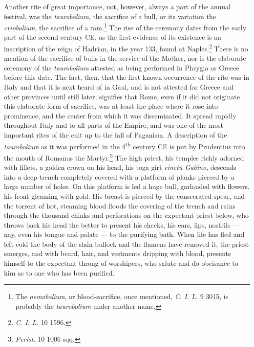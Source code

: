 \documentclass[a4paper, 11pt, oneside, polutonikogreek, english]{article}
\begin{document}
Another rite of great importance, not, however, always a part of the annual festival, was the \emph{taurobolium}, the sacrifice of a bull, or its variation the \emph{criobolium}, the sacrifice of a ram.\footnote{The \emph{aemobolium}, or blood-sacrifice, once mentioned, \emph{C. I. L.} 9 3015, is probably the \emph{taurobolium} under another name.} The rise of the ceremony dates from the early part of the second century \textsc{CE}, as the first evidence of its existence is an inscription of the reign of Hadrian, in the year 133, found at Naples.\footnote{\emph{C. I. L.} 10 1596.} There is no mention of the sacrifice of bulls in the service of the Mother, nor is the elaborate ceremony of the \emph{taurobolium} attested as being performed in Phrygia or Greece before this date. The fact, then, that the first known occurrence of the rite was in Italy and that it is next heard of in Gaul, and is not attested for Greece and other provinces until still later, signifies that Rome, even if it did not originate this elaborate form of sacrifice, was at least the place where it rose into prominence, and the center from which it was disseminated. It spread rapidly throughout Italy and to all parts of the Empire, and was one of the most important rites of the cult up to the fall of Paganism. A description of the \emph{taurobolium} as it was performed in the 4\textsuperscript{th} century \textsc{CE} is put by Prudentius into the mouth of Romanus the Martyr.\footnote{\emph{Perist.} 10 1006 sqq.} The high priest, his temples richly adorned with fillets, a golden crown on his head, his toga girt \emph{cinctu Gabino}, descends into a deep trench completely covered with a platform of planks pierced by a large number of holes. On this platform is led a huge bull, garlanded with flowers, his front gleaming with gold. His breast is pierced by the consecrated spear, and the torrent of hot, steaming blood floods the covering of the trench and rains through the thousand chinks and perforations on the expectant priest below, who throws back his head the better to present his cheeks, his ears, lips, nostrils --- nay, even his tongue and palate --- to the purifying bath. When life has fled and left cold the body of the slain bullock and the flamens have removed it, the priest emerges, and with beard, hair, and vestments dripping with blood, presents himself to the expectant throng of worshipers, who salute and do obeisance to him as to one who has been purified.
\end{document}
